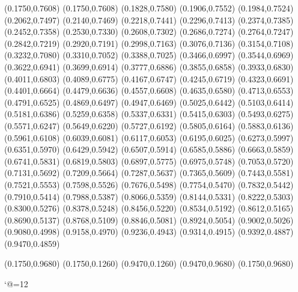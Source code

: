 \PST@LongDash(0.1750,0.7608)
(0.1750,0.7608)
(0.1828,0.7580)
(0.1906,0.7552)
(0.1984,0.7524)
(0.2062,0.7497)
(0.2140,0.7469)
(0.2218,0.7441)
(0.2296,0.7413)
(0.2374,0.7385)
(0.2452,0.7358)
(0.2530,0.7330)
(0.2608,0.7302)
(0.2686,0.7274)
(0.2764,0.7247)
(0.2842,0.7219)
(0.2920,0.7191)
(0.2998,0.7163)
(0.3076,0.7136)
(0.3154,0.7108)
(0.3232,0.7080)
(0.3310,0.7052)
(0.3388,0.7025)
(0.3466,0.6997)
(0.3544,0.6969)
(0.3622,0.6941)
(0.3699,0.6914)
(0.3777,0.6886)
(0.3855,0.6858)
(0.3933,0.6830)
(0.4011,0.6803)
(0.4089,0.6775)
(0.4167,0.6747)
(0.4245,0.6719)
(0.4323,0.6691)
(0.4401,0.6664)
(0.4479,0.6636)
(0.4557,0.6608)
(0.4635,0.6580)
(0.4713,0.6553)
(0.4791,0.6525)
(0.4869,0.6497)
(0.4947,0.6469)
(0.5025,0.6442)
(0.5103,0.6414)
(0.5181,0.6386)
(0.5259,0.6358)
(0.5337,0.6331)
(0.5415,0.6303)
(0.5493,0.6275)
(0.5571,0.6247)
(0.5649,0.6220)
(0.5727,0.6192)
(0.5805,0.6164)
(0.5883,0.6136)
(0.5961,0.6108)
(0.6039,0.6081)
(0.6117,0.6053)
(0.6195,0.6025)
(0.6273,0.5997)
(0.6351,0.5970)
(0.6429,0.5942)
(0.6507,0.5914)
(0.6585,0.5886)
(0.6663,0.5859)
(0.6741,0.5831)
(0.6819,0.5803)
(0.6897,0.5775)
(0.6975,0.5748)
(0.7053,0.5720)
(0.7131,0.5692)
(0.7209,0.5664)
(0.7287,0.5637)
(0.7365,0.5609)
(0.7443,0.5581)
(0.7521,0.5553)
(0.7598,0.5526)
(0.7676,0.5498)
(0.7754,0.5470)
(0.7832,0.5442)
(0.7910,0.5414)
(0.7988,0.5387)
(0.8066,0.5359)
(0.8144,0.5331)
(0.8222,0.5303)
(0.8300,0.5276)
(0.8378,0.5248)
(0.8456,0.5220)
(0.8534,0.5192)
(0.8612,0.5165)
(0.8690,0.5137)
(0.8768,0.5109)
(0.8846,0.5081)
(0.8924,0.5054)
(0.9002,0.5026)
(0.9080,0.4998)
(0.9158,0.4970)
(0.9236,0.4943)
(0.9314,0.4915)
(0.9392,0.4887)
(0.9470,0.4859)

\PST@Border(0.1750,0.9680)
(0.1750,0.1260)
(0.9470,0.1260)
(0.9470,0.9680)
(0.1750,0.9680)

\catcode`@=12
\fi
\endpspicture
